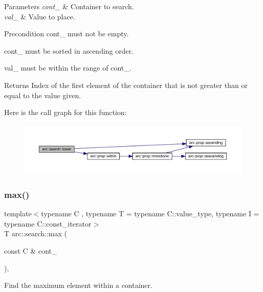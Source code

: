 \begin{DoxyParams}{Parameters}
{\em cont\+\_\+} & Container to search. \\
\hline
{\em val\+\_\+} & Value to place.\\
\hline
\end{DoxyParams}
\begin{DoxyPrecond}{Precondition}
cont\+\_\+ must not be empty. 

cont\+\_\+ must be sorted in ascending order. 

val\+\_\+ must be within the range of cont\+\_\+.
\end{DoxyPrecond}
\begin{DoxyReturn}{Returns}
Index of the first element of the container that is not greater than or equal to the value given. 
\end{DoxyReturn}
Here is the call graph for this function\+:\nopagebreak
\begin{figure}[H]
\begin{center}
\leavevmode
\includegraphics[width=350pt]{namespacearc_1_1search_ab5171637f0c917d6f387cb619a319ab5_cgraph}
\end{center}
\end{figure}
\mbox{\label{namespacearc_1_1search_ab5608d27962c637137d2c243213fa366}} 
\subsubsection{\texorpdfstring{max()}{max()}}
{\footnotesize\ttfamily template$<$typename C , typename T  = typename C\+::value\+\_\+type, typename I  = typename C\+::const\+\_\+iterator$>$ \\
T arc\+::search\+::max (\begin{DoxyParamCaption}\item[{const C \&}]{cont\+\_\+ }\end{DoxyParamCaption})\hspace{0.3cm}{\ttfamily [inline]}, {\ttfamily [noexcept]}}

Find the maximum element within a container.


